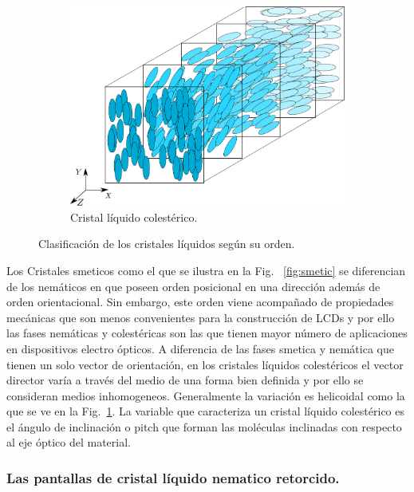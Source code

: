\begin{figure}[h!]
\begin{subfigure}{.5\textwidth}
  \centering
  \includegraphics[width=.6\linewidth]{Cholesteric_LC_2}
  \caption{Cristal líquido colestérico.}
  \label{fig:cholesteric}
\end{subfigure}
\caption{Clasificación de los cristales líquidos según su orden.}
\label{fig:CL_clasificacion}
\end{figure}

Los Cristales smeticos como el que se ilustra en la Fig.~
\ref{fig:smetic} se diferencian de los nemáticos en que poseen orden
posicional en una dirección además de orden orientacional. Sin embargo,
este orden viene acompañado de propiedades mecánicas que son menos
convenientes para la construcción de LCDs y por ello las fases
nemáticas y colestéricas son las que tienen mayor número de
aplicaciones en dispositivos electro ópticos. 
A diferencia de las fases smetica y nemática que tienen un solo vector
de orientación, en los cristales líquidos colestéricos el vector
director varía a través del medio de una forma bien
definida y por ello se consideran medios inhomogeneos. Generalmente la
variación es helicoidal como la que se ve en la Fig.~\ref{fig:cholesteric}.   
La variable que caracteriza un cristal líquido colestérico es el
ángulo de inclinación o pitch que forman las moléculas inclinadas con
respecto al eje óptico del material. 


\subsubsection{Las pantallas de cristal líquido nematico retorcido.}


